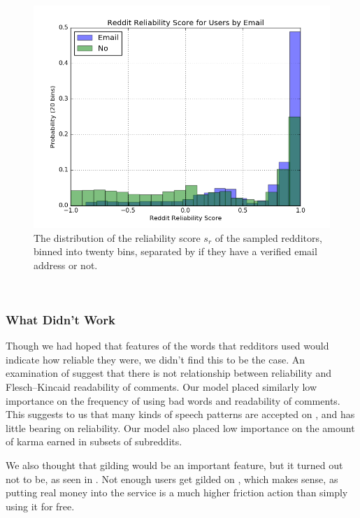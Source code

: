 \begin{figure}[tb]
    \centering
    \includegraphics[width=\linewidth]{../src/do_regression/figs/data_20_email.png}
    \caption{The distribution of the reliability score $s_r$ of the sampled redditors, binned into twenty bins, separated by if they have a verified email address or not.}
    \label{fig:data_20_email}
\end{figure}


\ \newline %
\subsubsection{What Didn't Work} %
\label{ssub:what_didn_t_work}

Though we had hoped that features of the words that redditors used would
indicate how reliable they were, we didn't find this to be the case. An
examination of  suggest that there is not
relationship between reliability and Flesch--Kincaid readability of comments.
Our model placed similarly low importance on the frequency of using bad words
and readability of comments. This suggests to us that many kinds of speech
patterns are accepted on \reddit{}, and has little bearing on reliability. Our
model also placed low importance on the amount of karma earned in subsets of
subreddits.

We also thought that gilding would be an important feature, but it turned out
not to be, as seen in . Not enough users get gilded
on \reddit{}, which makes sense, as putting real money into the service is a
much higher friction action than simply using it for free.

